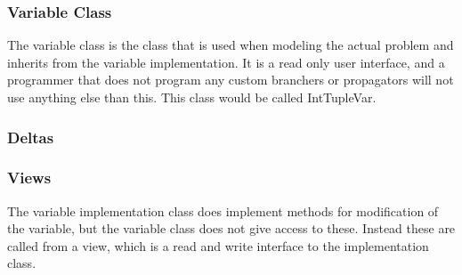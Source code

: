 \documentclass[a4paper,11pt]{article}
\begin{document}
\subsubsection{Variable Class}
The variable class is the class that is used when modeling the actual problem and inherits from the variable implementation. It is a read only user interface, and a programmer that does not program any custom branchers or propagators will not use anything else than this. This class would be called IntTupleVar.
\subsubsection{Deltas}
\subsubsection{Views}
The variable implementation class does implement methods for modification of the variable, but the variable class does not give access to these. Instead these are called from a view, which is a read and write interface to the implementation class.
\end{document}
